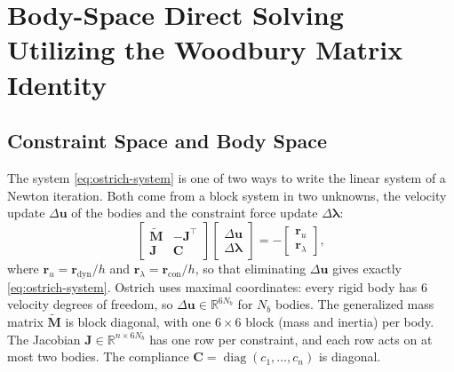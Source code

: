 \section{Body-Space Direct Solving Utilizing the Woodbury Matrix Identity}
\label{sec:body-space}

\subsection{Constraint Space and Body Space}
\label{sec:body-space-idea}

The system \eqref{eq:ostrich-system} is one of two ways to write the
linear system of a Newton iteration. Both come from a block system in two
unknowns, the velocity update $\Delta\mathbf{u}$ of the bodies and the
constraint force update $\Delta\boldsymbol{\lambda}$:
\begin{equation}
  \begin{bmatrix}
    \tilde{\mathbf{M}} & -\mathbf{J}^\top \\
    \mathbf{J} & \mathbf{C}
  \end{bmatrix}
  \begin{bmatrix} \Delta\mathbf{u} \\ \Delta\boldsymbol{\lambda} \end{bmatrix}
  = -\begin{bmatrix} \mathbf{r}_u \\ \mathbf{r}_\lambda \end{bmatrix} ,
  \label{eq:kkt}
\end{equation}
where $\mathbf{r}_u = \mathbf{r}_{\text{dyn}}/h$ and
$\mathbf{r}_\lambda = \mathbf{r}_{\text{con}}/h$, so that eliminating
$\Delta\mathbf{u}$ gives exactly \eqref{eq:ostrich-system}. Ostrich uses
maximal coordinates: every rigid body has $6$ velocity degrees of freedom,
so $\Delta\mathbf{u} \in \mathbb{R}^{6N_b}$ for $N_b$ bodies. The
generalized mass matrix $\tilde{\mathbf{M}}$ is block diagonal, with one
$6 \times 6$ block (mass and inertia) per body. The Jacobian
$\mathbf{J} \in \mathbb{R}^{n \times 6N_b}$ has one row per constraint, and
each row acts on at most two bodies. The compliance $\mathbf{C} =
\operatorname{diag}(c_1, \dots, c_n)$ is diagonal.

